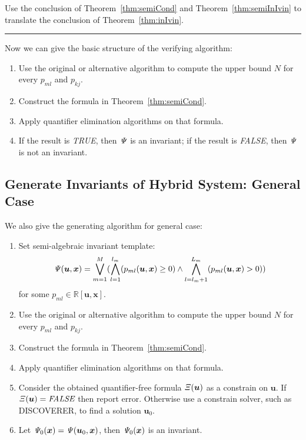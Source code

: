 \documentclass{jssc}
\newcommand{\rulex}{\hfill\rule{1mm}{3mm}}
\begin{document}
\proof
Use the conclusion of Theorem~\ref{thm:semiCond} and Theorem~\ref{thm:semiInIvin} to translate the conclusion of Theorem~\ref{thm:inIvin}.
\rulex

Now we can give the basic structure of the verifying algorithm:
\begin{enumerate}
	\item Use the original or alternative algorithm to compute the upper bound $N$ for every $p_{ml}$ and $p_{kj}$.
	\item Construct the formula in Theorem~\ref{thm:semiCond}.
	\item Apply quantifier elimination algorithms on that formula.
	\item If the result is \emph{TRUE}, then ${\it \Psi}$ is an invariant; if the result is \emph{FALSE}, then ${\it \Psi}$ is not an invariant.
\end{enumerate}

\subsection{Generate Invariants of Hybrid System: General Case}
We also give the generating algorithm for general case: 
\begin{enumerate}
	\item Set semi-algebraic invariant template: 
		\begin{equation*}
			{\it \Psi}(\boldsymbol{u}, \boldsymbol{x}) = \bigvee_{m=1}^M (\bigwedge_{l=1}^{l_m} (p_{ml}(\boldsymbol{u}, \boldsymbol{x})\geq 0) \wedge \bigwedge_{l=l_m+1}^{L_m} (p_{ml}(\boldsymbol{u}, \boldsymbol{x}) > 0)) 
		\end{equation*}
		for some $p_{ml} \in \mathbb{R}[\boldsymbol{u}, \boldsymbol{x}]$.
	\item Use the original or alternative algorithm to compute the upper bound $N$ for every $p_{ml}$ and $p_{kj}$.
	\item Construct the formula in Theorem~\ref{thm:semiCond}.
	\item Apply quantifier elimination algorithms on that formula.
	\item Consider the obtained quantifier-free formula ${\it \Xi}(\boldsymbol{u})$ as a constrain on $\boldsymbol{u}$. If ${\it \Xi}(\boldsymbol{u}) = \textit{FALSE}$ then report error. Otherwise use a constrain solver, such as DISCOVERER\cite{xia2007discoverer}, to find a solution $\boldsymbol{u}_0$.
	\item Let ${\it \Psi}_0(\boldsymbol{x}) = {\it \Psi}(\boldsymbol{u}_0, \boldsymbol{x})$, then ${\it \Psi}_0(\boldsymbol{x})$ is an invariant.
\end{enumerate}
\end{document}
